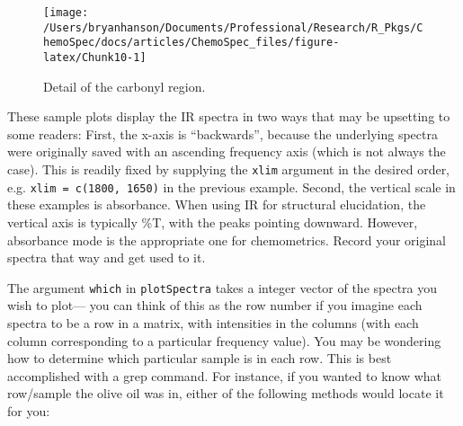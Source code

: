 \documentclass[letter,10pt,twocolumn,twoside,printwatermark=false]{pinp}
\begin{document}
\begin{Shaded}
\begin{Highlighting}[]
   \NormalTok{(}\NormalTok{, }\NormalTok{, }\NormalTok{, }\NormalTok{),}
   \NormalTok{(}\NormalTok{, }\NormalTok{),}
   \NormalTok{,}
   \NormalTok{,}
   \NormalTok{(}\NormalTok{, }\NormalTok{))}
\end{Highlighting}
\end{Shaded}

\begin{figure}

{\centering \texttt{[image: /Users/bryanhanson/Documents/Professional/Research/R\_Pkgs/ChemoSpec/docs/articles/ChemoSpec\_files/figure-latex/Chunk10-1]} 

}

\caption{\label{subplot}Detail of the carbonyl region.}\label{fig:Chunk10}
\end{figure}

These sample plots display the IR spectra in two ways that may be
upsetting to some readers: First, the x-axis is ``backwards'', because
the underlying spectra were originally saved with an ascending frequency
axis (which is not always the case). This is readily fixed by supplying
the \texttt{xlim} argument in the desired order, e.g.
\texttt{xlim = c(1800, 1650)} in the previous example. Second, the
vertical scale in these examples is absorbance. When using IR for
structural elucidation, the vertical axis is typically \%T, with the
peaks pointing downward. However, absorbance mode is the appropriate one
for chemometrics. Record your original spectra that way and get used to
it.

The argument \texttt{which} in \texttt{plotSpectra} takes a integer
vector of the spectra you wish to plot--- you can think of this as the
row number if you imagine each spectra to be a row in a matrix, with
intensities in the columns (with each column corresponding to a
particular frequency value). You may be wondering how to determine which
particular sample is in each row. This is best accomplished with a grep
command. For instance, if you wanted to know what row/sample the olive
oil was in, either of the following methods would locate it for you:
\end{document}
